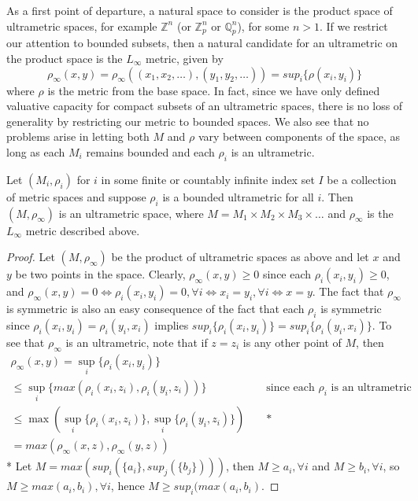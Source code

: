 As a first point of departure, a natural space to consider is the product space of ultrametric spaces, for example $\mathbb{Z}^n$ (or $\mathbb{Z}_p^n$ or $\mathbb{Q}_p^n$), for some $n >1$. If we restrict our attention to bounded subsets, then a natural candidate for an ultrametric on the product space is the $L_\infty$ metric, given by
\[ \rho_\infty(x,y) = \rho_\infty((x_1,x_2,\ldots),(y_1,y_2, \ldots)) = sup_{i} \{\rho(x_i, y_i)\}\] where $\rho$ is the metric from the base space. In fact, since we have only defined valuative capacity for compact subsets of an ultrametric spaces, there is no loss of generality by restricting our metric to bounded spaces.  We also see that no problems arise in letting both $M$ and $\rho$ vary between components of the space, as long as each $M_i$ remains bounded and each $\rho_i$ is an ultrametric. 

\begin{proposition*}
Let $(M_i, \rho_i)$ for $i$ in some finite or countably infinite index set $I$ be a collection of metric spaces and suppose $\rho_i$ is a bounded ultrametric for all $i$. Then $(M,\rho_\infty)$ is an ultrametric space, where $M=M_1 \times M_2 \times M_3 \times \ldots$ and $\rho_\infty$ is the  $L_\infty$ metric described above.
\end{proposition*}

\begin{proof}
Let $(M, \rho_\infty)$ be the product of ultrametric spaces as above and let $x$ and $y$ be two points in the space. Clearly, $\rho_\infty(x,y) \geq 0$ since each $\rho_i(x_i,y_i) \geq 0$, and $\rho_\infty(x,y) = 0 \iff \rho_i(x_i,y_i) =0,\forall i \iff x_i=y_i, \forall i \iff x=y$. The fact that $\rho_\infty$ is symmetric is also an easy consequence of the fact that each $\rho_i$ is symmetric since  $\rho_i(x_i, y_i) = \rho_i(y_i, x_i)$ implies $sup_{i}\{\rho_i(x_i, y_i)\} = sup_{i}\{\rho_i(y_i, x_i)\}$. To see that $\rho_\infty$ is an ultrametric, note that if $z=z_i$ is any other point of $M$, then
\begin{align*}
    \rho_\infty(x, y) = \sup_i\{\rho_i(x_i,y_i)\} && \\
    \leq \sup_i\{max(\rho_i(x_i,z_i),\rho_i(y_i,z_i))\} && \text{ since each $\rho_i$ is an ultrametric } \\
    \leq \max(\sup_i\{\rho_i(x_i,z_i)\}, \sup_i\{\rho_i(y_i,z_i)\}) && \text{ *}  \\
    = max(\rho_\infty(x,z),\rho_\infty(y,z))  
\end{align*}
* Let $M= max(sup_i(\{a_i\}, sup_j(\{b_j\})))$, then $M \geq a_i, \forall i$ and $M \geq b_i, \forall i$, so $M \geq max(a_i,b_i), \forall i$, hence $M \geq sup_i(max(a_i,b_i)$.
\end{proof}

